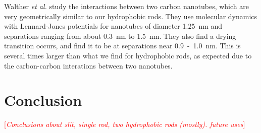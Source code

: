 \documentclass[letterpaper,twocolumn,amsmath,amssymb,prb]{revtex4-1}
\newcommand{\needsworknow}[1]{\textcolor{red}{[\emph{#1}]}}
\begin{document}
Walther \emph{et al.}\cite{walther2004hydrodynamic} study the interactions between two
carbon nanotubes, which are very geometrically similar to our hydrophobic rods. 
They use molecular dynamics with Lennard-Jones potentials for
nanotubes of diameter 1.25~nm and separations ranging from about 0.3~nm to 1.5~nm.
They also find a drying transition occurs, and find it to be at separations near
0.9~-~1.0~nm\cite{walther2004hydrodynamic}. This is several times larger than
what we find for hydrophobic rods, as expected due to the carbon-carbon
interations between two nanotubes. 

\section{Conclusion}

\needsworknow{Conclusions about slit, single rod, two hydrophobic rods (mostly). future uses}


\end{document}
